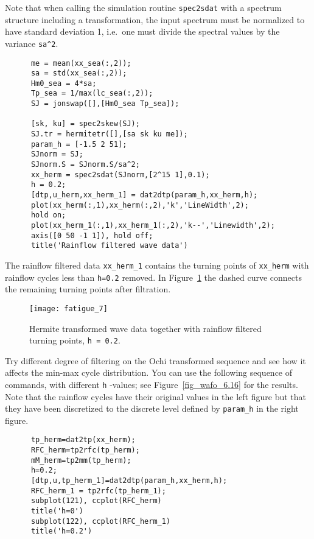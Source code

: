 Note that when calling the simulation routine
\verb+spec2sdat+ with a spectrum structure
including a transformation, the input spectrum must be normalized to have
standard deviation 1, i.e.\ one must divide the spectral values by
the variance \verb+sa^2+.
{\small
\begin{verbatim}
      me = mean(xx_sea(:,2));
      sa = std(xx_sea(:,2));
      Hm0_sea = 4*sa;
      Tp_sea = 1/max(lc_sea(:,2));
      SJ = jonswap([],[Hm0_sea Tp_sea]);

      [sk, ku] = spec2skew(SJ);
      SJ.tr = hermitetr([],[sa sk ku me]);
      param_h = [-1.5 2 51];
      SJnorm = SJ;
      SJnorm.S = SJnorm.S/sa^2;
      xx_herm = spec2sdat(SJnorm,[2^15 1],0.1);
      h = 0.2;
      [dtp,u_herm,xx_herm_1] = dat2dtp(param_h,xx_herm,h);
      plot(xx_herm(:,1),xx_herm(:,2),'k','LineWidth',2);
      hold on;
      plot(xx_herm_1(:,1),xx_herm_1(:,2),'k--','Linewidth',2);
      axis([0 50 -1 1]), hold off;
      title('Rainflow filtered wave data')
\end{verbatim}}

The rainflow filtered data \verb+xx_herm_1+ contains the turning
points of \verb+xx_herm+ with rainflow cycles less than \verb+h=0.2+
removed. In Figure~\ref{fig6-1} the dashed curve connects the
remaining turning points after filtration.

\begin{figure}[tbh]
\centering
\texttt{[image: fatigue\_7]}
\vspace{-3mm}
\caption[Hermite transformed wave data and rainflow filtered turning points]{
Hermite transformed wave data together with rainflow filtered turning
  points, {\tt h = 0.2}.}
\label{fig6-1}
\end{figure}

Try different degree of filtering on the Ochi transformed sequence and
see how it affects the min-max cycle distribution. You can use the
following sequence of commands, with different \verb+h+ -values;
see Figure~\ref{fig_wafo_6.16} for the results. Note that the rainflow cycles
have their original values in the left figure but that they have been
discretized to the discrete level defined by \verb+param_h+ in the
right figure.
{\small\begin{verbatim}
      tp_herm=dat2tp(xx_herm);
      RFC_herm=tp2rfc(tp_herm);
      mM_herm=tp2mm(tp_herm);
      h=0.2;
      [dtp,u,tp_herm_1]=dat2dtp(param_h,xx_herm,h);
      RFC_herm_1 = tp2rfc(tp_herm_1);
      subplot(121), ccplot(RFC_herm)
      title('h=0')
      subplot(122), ccplot(RFC_herm_1)
      title('h=0.2')
\end{verbatim}}

